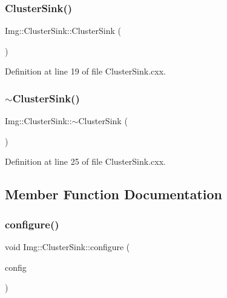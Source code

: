 \subsubsection{\texorpdfstring{Cluster\+Sink()}{ClusterSink()}}
{\footnotesize\ttfamily Img\+::\+Cluster\+Sink\+::\+Cluster\+Sink (\begin{DoxyParamCaption}{ }\end{DoxyParamCaption})}



Definition at line 19 of file Cluster\+Sink.\+cxx.

\mbox{\label{class_wire_cell_1_1_img_1_1_cluster_sink_a9d687ac785dc58a61e3fbe818e29aaa1}} 
\subsubsection{\texorpdfstring{$\sim$\+Cluster\+Sink()}{~ClusterSink()}}
{\footnotesize\ttfamily Img\+::\+Cluster\+Sink\+::$\sim$\+Cluster\+Sink (\begin{DoxyParamCaption}{ }\end{DoxyParamCaption})\hspace{0.3cm}{\ttfamily [virtual]}}



Definition at line 25 of file Cluster\+Sink.\+cxx.



\subsection{Member Function Documentation}
\mbox{\label{class_wire_cell_1_1_img_1_1_cluster_sink_ac53ceab525a2b8f87258e7309cc98bed}} 
\subsubsection{\texorpdfstring{configure()}{configure()}}
{\footnotesize\ttfamily void Img\+::\+Cluster\+Sink\+::configure (\begin{DoxyParamCaption}\item[{const \hyperlink{namespace_wire_cell_a9f705541fc1d46c608b3d32c182333ee}{Wire\+Cell\+::\+Configuration} \&}]{config }\end{DoxyParamCaption})\hspace{0.3cm}{\ttfamily [virtual]}}



